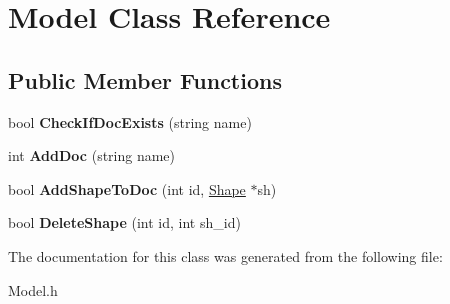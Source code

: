 \hypertarget{classModel}{}\section{Model Class Reference}
\label{classModel}
\subsection*{Public Member Functions}
\begin{DoxyCompactItemize}
\item 
\mbox{\label{classModel_a572b6d8628616e9b6a137323a557960b}} 
bool {\bfseries Check\+If\+Doc\+Exists} (string name)
\item 
\mbox{\label{classModel_af63633da9c40c4d601d9b503588dfdac}} 
int {\bfseries Add\+Doc} (string name)
\item 
\mbox{\label{classModel_aa77e66b00c45279f749987d635f48068}} 
bool {\bfseries Add\+Shape\+To\+Doc} (int id, \hyperlink{classShape}{Shape} $\ast$sh)
\item 
\mbox{\label{classModel_a20a5cf05d0c9b81c683ec3d05cb522fd}} 
bool {\bfseries Delete\+Shape} (int id, int sh\+\_\+id)
\end{DoxyCompactItemize}


The documentation for this class was generated from the following file\+:\begin{DoxyCompactItemize}
\item 
Model.\+h\end{DoxyCompactItemize}
